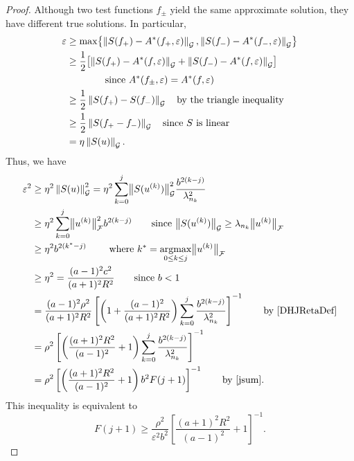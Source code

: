 \documentclass[graybox,footinfo]{svmult}
\newcommand{\DHJRnorm}[2][{}]{\ensuremath{\left \lVert #2 \right \rVert}_{#1}}
\newcommand{\DHJRbignorm}[2][{}]{\ensuremath{\bigl \lVert #2 \bigr \rVert}_{#1}}
\begin{document}
\begin{proof}
Although two test functions $f_\pm$ yield the same approximate solution, they have different true solutions.  In particular,
\begin{align*}
\varepsilon &\ge \max \bigl\{\DHJRnorm[\calG]{S(f_+) - A^*(f_+,\varepsilon)}, \DHJRnorm[\calG]{S(f_-) - A^*(f_-,\varepsilon)} \bigr\} \\
&\ge \frac 12 \bigl[\DHJRnorm[\calG]{S(f_+) - A^*(f,\varepsilon)} + \DHJRnorm[\calG]{S(f_-) - A^*(f,\varepsilon)}  \bigr] \\
&\qquad \qquad \text{since } A^*(f_\pm,\varepsilon) = A^*(f,\varepsilon) \\
&\ge \frac 12 \DHJRnorm[\calG]{S(f_+) - S(f_-)} \quad \text{by the triangle inequality}\\
&\ge \frac 12 \DHJRnorm[\calG]{S(f_+ - f_-)} \quad \text{since $S$ is linear}\\
&= \eta \DHJRnorm[\calG]{S(u)}.
\end{align*}
Thus, we have 
\begin{align*}
\varepsilon^2  & \ge \eta^2 \DHJRnorm[\calG]{S(u)}^2= 
\eta^2 \sum_{k=0}^{j} \DHJRbignorm[\calG]{S(u^{(k)})}^2  \frac{b^{2(k-j)}}{\lambda_{n_k}^2}\\
& \ge \eta^2 
\sum_{k=0}^{j} \DHJRbignorm[\calF]{u^{(k)}}^2 
b^{2(k-j)} 
\qquad  \text{since } \DHJRbignorm[\calG]{S(u^{(k)})} \ge \lambda_{n_k} \DHJRbignorm[\calF]{u^{(k)}} \\
& \ge  \eta^2 b^{2(k^{*}-j)} \qquad \text{ where } k^* = \argmax_{0 \le k \le j} \DHJRbignorm[\calF]{u^{(k)}} \\
& \ge \eta^2 = \frac{(a-1)^2c^2}{(a+1)^2R^2} 
\qquad \text{since } b < 1\\
&
=\frac{(a-1)^2 \rho^2}{(a+1)^2R^2}\left[\left(1+\frac{(a-1)^2}{(a+1)^{2} R^2 }\right)\sum_{k=0}^j \frac{b^{2(k-j)}}{\lambda_{n_{k}}^2}\right]^{-1} 
\qquad \text{by \eqref{DHJRetaDef}}\\
& =  \rho^2 \left[\left(\frac{(a+1)^{2} R^2 }{(a-1)^2} + 1\right)\sum_{k=0}^j \frac{b^{2(k-j)}}{\lambda_{n_{k}}^2}\right]^{-1} \\
& = \rho^2 \left[\left(\frac{(a+1)^{2} R^2 }{(a-1)^2} + 1\right) b^2F(j+1)\right]^{-1} 
\qquad \text{by \eqref{jsum}}.
\end{align*}
 This inequality is equivalent to 
\begin{equation}
    F(j+1) \ge  \frac{\rho^2}{\varepsilon^2 b^2}
\left[\frac{(a+1)^{2} R^2 }{(a-1)^2} + 1\right]^{-1}.
\end{equation}



\end{proof}
\end{document}
